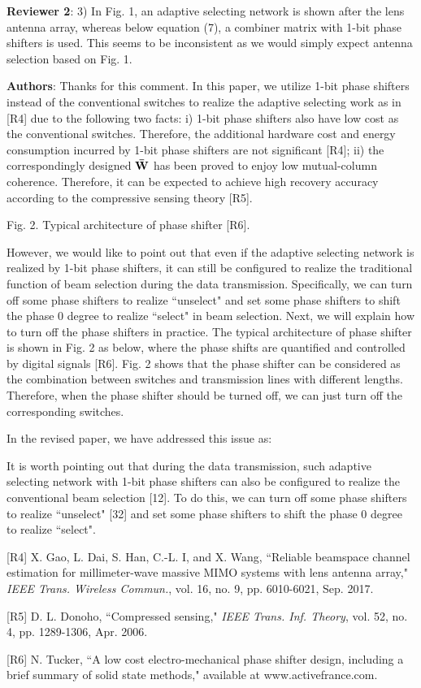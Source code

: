 \documentclass[a4paper,12pt]{article}
\begin{document}
\textbf{Reviewer 2}: 3) In Fig. 1, an adaptive selecting network is shown after the lens antenna array, whereas below equation (7), a combiner matrix with 1-bit phase shifters is used. This seems to be inconsistent as we would simply expect antenna selection based on Fig. 1.

{\color{blue} \textbf{Authors}: Thanks for this comment. In this paper, we utilize 1-bit phase shifters instead of the conventional switches to realize the adaptive selecting work as in [R4] due to the following two facts: i) 1-bit phase shifters also have low cost as the conventional switches. Therefore, the additional hardware cost and energy consumption incurred by 1-bit phase shifters are not significant [R4]; ii) the correspondingly designed ${{\bf{\bar W}}}$ has been proved to enjoy low mutual-column coherence. Therefore, it can be expected to achieve high recovery accuracy according to the compressive sensing theory [R5].

Fig. 2. Typical architecture of phase shifter [R6].

However, we would like to point out that even if the adaptive selecting network is realized by 1-bit phase shifters, it can still be configured to realize the traditional function of beam selection during the data transmission. Specifically, we can turn off some phase shifters to realize ``unselect" and set some phase shifters to shift the phase 0 degree to realize ``select" in beam selection. Next, we will explain how to turn off the phase shifters in practice. The typical architecture of phase shifter is shown in Fig. 2 as below, where the phase shifts are quantified and controlled by digital signals [R6]. Fig. 2 shows that the phase shifter can be considered as the combination between switches and transmission lines with different lengths. Therefore, when the phase shifter should be turned off, we can just turn off the corresponding switches.



In the revised paper, we have addressed this issue as:
\begin{framed}
{\color{red} It is worth pointing out that during the data transmission, such adaptive selecting network with 1-bit phase shifters can also be configured to realize the conventional beam selection [12]. To do this, we can turn off some phase shifters to realize ``unselect" [32] and set some phase shifters to shift the phase 0 degree to realize ``select".}
\end{framed}


[R4] X. Gao, L. Dai, S. Han, C.-L. I, and X. Wang, ``Reliable beamspace channel estimation for millimeter-wave massive MIMO systems with lens antenna array," {\it IEEE Trans. Wireless Commun.}, vol. 16, no. 9, pp. 6010-6021, Sep. 2017.

[R5] D. L. Donoho, ``Compressed sensing," {\it IEEE Trans. Inf. Theory}, vol. 52, no. 4, pp. 1289-1306, Apr. 2006.

[R6] N. Tucker, ``A low cost electro-mechanical phase shifter design, including a brief summary of solid state methods," available at www.activefrance.com.

}
\end{document}
